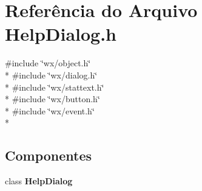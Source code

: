 \section{Referência do Arquivo Help\+Dialog.\+h}
\label{_help_dialog_8h}
{\ttfamily \#include \char`\"{}wx/object.\+h\char`\"{}}\\*
{\ttfamily \#include \char`\"{}wx/dialog.\+h\char`\"{}}\\*
{\ttfamily \#include \char`\"{}wx/stattext.\+h\char`\"{}}\\*
{\ttfamily \#include \char`\"{}wx/button.\+h\char`\"{}}\\*
{\ttfamily \#include \char`\"{}wx/event.\+h\char`\"{}}\\*
\subsection*{Componentes}
\begin{DoxyCompactItemize}
\item 
class {\bf Help\+Dialog}
\end{DoxyCompactItemize}
